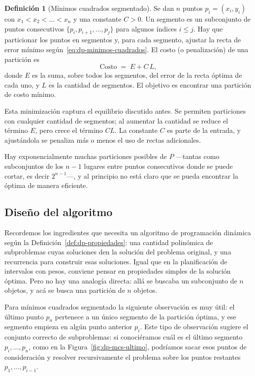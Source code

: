 \documentclass[12pt, spanish, oneside, openany]{book}
\theoremstyle{uprightplain}
\theoremstyle{definition}
\newtheorem{definicion}[teorema]{Definición}
\theoremstyle{remark}
\theoremstyle{definition}
\begin{document}
\begin{definicion}[Mínimos cuadrados segmentado]
\label{def:dp-mcs}
Se dan $n$ puntos $p_i=(x_i,y_i)$ con $x_1<x_2<\dots<x_n$ y una constante $C>0$. Un segmento es un subconjunto de puntos consecutivos $\{p_i,p_{i+1},\dots,p_j\}$ para algunos índices $i\le j$. Hay que particionar los puntos en segmentos y, para cada segmento, ajustar la recta de error mínimo según~\eqref{eq:dp-minimos-cuadrados}. El costo (o penalización) de una partición es
\[
\text{Costo} \;=\; E + C\,L,
\]
donde $E$ es la suma, sobre todos los segmentos, del error de la recta óptima de cada uno, y $L$ es la cantidad de segmentos. El objetivo es encontrar una partición de costo mínimo.
\end{definicion}

Esta minimización captura el equilibrio discutido antes. Se permiten particiones con cualquier cantidad de segmentos; al aumentar la cantidad se reduce el término $E$, pero crece el término $CL$. La constante $C$ es parte de la entrada, y ajustándola se penaliza más o menos el uso de rectas adicionales.

Hay exponencialmente muchas particiones posibles de $P$ ---tantas como subconjuntos de los $n-1$ lugares entre puntos consecutivos donde se puede cortar, es decir $2^{n-1}$---, y al principio no está claro que se pueda encontrar la óptima de manera eficiente.

\subsection{Diseño del algoritmo}

Recordemos los ingredientes que necesita un algoritmo de programación dinámica según la Definición~\ref{def:dp-propiedades}: una cantidad polinómica de subproblemas cuyas soluciones den la solución del problema original, y una recurrencia para construir esas soluciones. Igual que en la planificación de intervalos con pesos, conviene pensar en propiedades simples de la solución óptima. Pero no hay una analogía directa: allá se buscaba un subconjunto de $n$ objetos, y acá se busca una partición de $n$ objetos.

Para mínimos cuadrados segmentado la siguiente observación es muy útil: el último punto $p_n$ pertenece a un único segmento de la partición óptima, y ese segmento empieza en algún punto anterior $p_i$. Este tipo de observación sugiere el conjunto correcto de subproblemas: si conociéramos cuál es el último segmento $p_i,\dots,p_n$, como en la Figura~\ref{fig:dp-mcs-ultimo}, podríamos sacar esos puntos de consideración y resolver recursivamente el problema sobre los puntos restantes $p_1,\dots,p_{i-1}$.
\end{document}
